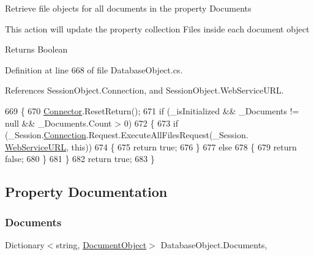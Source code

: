 Retrieve file objects for all documents in the property \textquotesingle{}Documents\textquotesingle{} 

This action will update the property collection Files inside each document object

\begin{DoxyReturn}{Returns}
Boolean
\end{DoxyReturn}


Definition at line 668 of file Database\+Object.\+cs.



References Session\+Object.\+Connection, and Session\+Object.\+Web\+Service\+U\+RL.


\begin{DoxyCode}
669     \{
670         \mbox{\hyperlink{class_connector}{Connector}}.ResetReturn();
671         \textcolor{keywordflow}{if} (\_isInitialized && \_Documents != null && \_Documents.Count > 0)
672         \{
673             \textcolor{keywordflow}{if} (\_Session.\mbox{\hyperlink{class_session_object_a014bdbf705a753540e19bfb53030c55c}{Connection}}.Request.ExecuteAllFilesRequest(\_Session.
      \mbox{\hyperlink{class_session_object_a697c071c812fbf7ad1166b896fb44c16}{WebServiceURL}}, \textcolor{keyword}{this}))
674             \{
675                 \textcolor{keywordflow}{return} \textcolor{keyword}{true};
676             \}
677             \textcolor{keywordflow}{else}
678             \{
679                 \textcolor{keywordflow}{return} \textcolor{keyword}{false};
680             \}
681         \}
682         \textcolor{keywordflow}{return} \textcolor{keyword}{true};
683     \}
\end{DoxyCode}


\subsection{Property Documentation}
\mbox{\label{class_database_object_afaf1159aa427c5bcce01c4b8c6f34514}} 
\subsubsection{\texorpdfstring{Documents}{Documents}}
{\footnotesize\ttfamily Dictionary$<$string, \mbox{\hyperlink{class_document_object}{Document\+Object}}$>$ Database\+Object.\+Documents\hspace{0.3cm}{\ttfamily [get]}, {\ttfamily [set]}}



